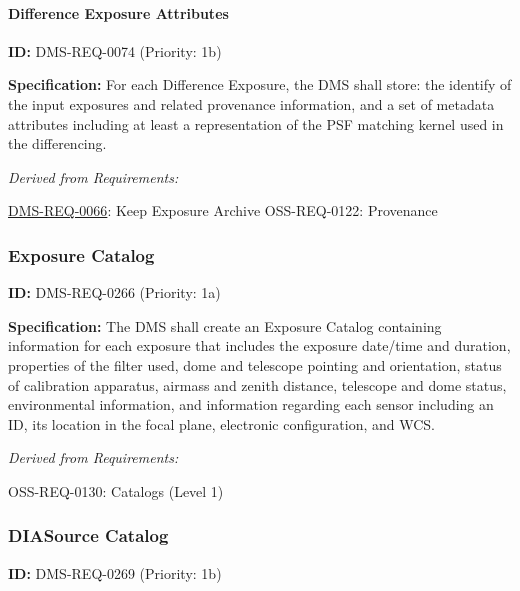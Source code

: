 \documentclass[SE,toc,lsstdraft]{lsstdoc}
\begin{document}
\paragraph{Difference Exposure Attributes}\hfill  %

\label{DMS-REQ-0074}
\textbf{ID:} DMS-REQ-0074 (Priority: 1b)

\textbf{Specification:} For each Difference Exposure, the DMS shall store: the identify of the input exposures and related provenance information, and a set of metadata attributes including at least a representation of the PSF matching kernel used in the differencing.

\emph{Derived from Requirements:}

\hyperref[DMS-REQ-0066]{DMS-REQ-0066}:
Keep Exposure Archive \newline
OSS-REQ-0122:
Provenance \newline

\subsubsection{Exposure Catalog}

\label{DMS-REQ-0266}
\textbf{ID:} DMS-REQ-0266 (Priority: 1a)

\textbf{Specification:} The DMS shall create an Exposure Catalog containing information for each exposure that includes the exposure date/time and duration, properties of the filter used, dome and telescope pointing and orientation, status of calibration apparatus, airmass and zenith distance, telescope and dome status, environmental information, and information regarding each sensor including an ID, its location in the focal plane, electronic configuration, and WCS.

\emph{Derived from Requirements:}

OSS-REQ-0130:
Catalogs (Level 1) \newline

\subsubsection{DIASource Catalog}

\label{DMS-REQ-0269}
\textbf{ID:} DMS-REQ-0269 (Priority: 1b)
\end{document}
